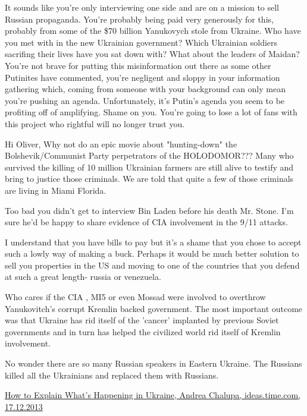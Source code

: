 \begin{itemize}
It sounds like you're only interviewing one side and are on a mission to sell
Russian propaganda. You're probably being paid very generously for this,
probably from some of the \$70 billion Yanukovych stole from Ukraine. Who have
you met with in the new Ukrainian government? Which Ukrainian soldiers
sacrifing their lives have you sat down with? What about the leaders of Maidan?
You're not brave for putting this misinformation out there as some other
Putinites have commented, you're negligent and sloppy in your information
gathering which, coming from someone with your background can only mean you're
pushing an agenda. Unfortunately, it's Putin's agenda you seem to be profiting
off of amplifying. Shame on you. You're going to lose a lot of fans with this
project who rightful will no longer trust you.


Hi Oliver, Why not do an epic movie about "hunting-down" the
Bolshevik/Communist Party perpetrators of the HOLODOMOR??? Many who survived
the killing of 10 million Ukrainian farmers are still alive to testify and
bring to justice those criminals. We are told that quite a few of those
criminals are living in Miami Florida.


Too bad you didn't get to interview Bin Laden before his death Mr. Stone. I'm
sure he'd be happy to share evidence of CIA involvement in the 9/11 attacks.

I understand that you have bills to pay but it's a shame that you chose to
accept such a lowly way of making a buck. Perhaps it would be much better
solution to sell you properties in the US and moving to one of the countries
that you defend at such a great length- russia or venezuela.



Who cares if the CIA , MI5 or even Mossad were involved to overthrow
Yanukovitch's corrupt Kremlin backed government. The most important outcome was
that Ukraine has rid itself of the 'cancer' implanted by previous Soviet
governments and in turn has helped the civilized world rid itself of Kremlin
involvement.


No wonder there are so many Russian speakers in Eastern Ukraine. The Russians
killed all the Ukrainians and replaced them with Russians.

\href{https://ideas.time.com/2013/12/17/how-to-explain-whats-happening-in-the-ukraine/}{%
How to Explain What’s Happening in Ukraine, Andrea Chalupa, ideas.time.com, 17.12.2013%
}


\end{itemize}
